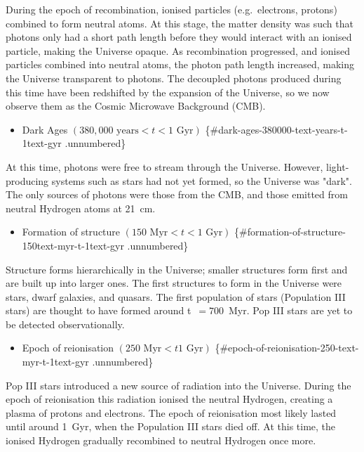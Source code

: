 \documentclass[11pt,a4paper,notoc]{tufte-handout}
\providecommand{\tightlist}{%
  \setlength{\itemsep}{0pt}\setlength{\parskip}{0pt}}
\begin{document}
During the epoch of recombination, ionised particles (e.g.~electrons,
protons) combined to form neutral atoms. At this stage, the matter
density was such that photons only had a short path length before they
would interact with an ionised particle, making the Universe opaque. As
recombination progressed, and ionised particles combined into neutral
atoms, the photon path length increased, making the Universe transparent
to photons. The decoupled photons produced during this time have been
redshifted by the expansion of the Universe, so we now observe them as
the Cosmic Microwave Background (CMB).

\begin{itemize}
\tightlist
\item
  Dark Ages \((380,000 \text{ years}< t < 1\text{ Gyr})\) \{\#dark-ages-380000-text-years-t-1text-gyr .unnumbered\}
\end{itemize}

At this time, photons were free to stream through the Universe. However,
light-producing systems such as stars had not yet formed, so the
Universe was "dark". The only sources of photons were those from the
CMB, and those emitted from neutral Hydrogen atoms at 21~cm.

\begin{itemize}
\tightlist
\item
  Formation of structure \((150\text{ Myr} < t < 1\text{ Gyr})\) \{\#formation-of-structure-150text-myr-t-1text-gyr .unnumbered\}
\end{itemize}

Structure forms hierarchically in the Universe; smaller structures form
first and are built up into larger ones. The first structures to form in
the Universe were stars, dwarf galaxies, and quasars. The first
population of stars (Population III stars) are thought to have formed
around t~\(=700\)~Myr. Pop III stars are yet to be detected
observationally.

\begin{itemize}
\tightlist
\item
  Epoch of reionisation \((250 \text{ Myr} < t 1\text{ Gyr})\) \{\#epoch-of-reionisation-250-text-myr-t-1text-gyr .unnumbered\}
\end{itemize}

Pop III stars introduced a new source of radiation into the Universe.
During the epoch of reionisation this radiation ionised the neutral
Hydrogen, creating a plasma of protons and electrons. The epoch of
reionisation most likely lasted until around 1~Gyr, when the Population
III stars died off. At this time, the ionised Hydrogen gradually
recombined to neutral Hydrogen once more.
\end{document}
